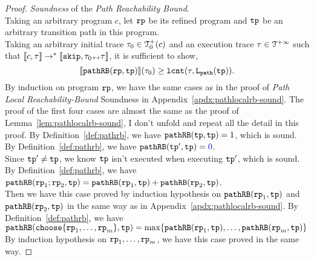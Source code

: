 \begin{proof}
\emph{Soundness} of the \emph{Path Reachability Bound}.
  \\
  Taking an arbitrary program $c$, let $\mathtt{rp}$ be its refined program and $\mathtt{tp}$ be an arbitrary transition path in this program.
  \\
Taking an arbitrary initial trace $\mathtt{\tau}_0 \in \mathcal{T}^{+}_0(c)$  and an execution trace $\mathtt{\tau} \in \mathcal{T}^{+\infty}$
 such that $\llbracket {c}, \mathtt{\tau} \rrbracket \to^{*} \llbracket \mathtt{skip}, \mathtt{\tau}_0 {\scriptscriptstyle ++} \mathtt{\tau} \rrbracket$,
 it is sufficient to show,
 \[
 \llbracket \mathtt{pathRB}(\mathtt{rp}, \mathtt{tp}) \rrbracket(\mathtt{\tau}_0) \geq \mathtt{lcnt}(\mathtt{\tau}, \mathtt{L}_{\mathtt{path}}(\mathtt{tp})) .
 \]
By induction on program $\mathtt{rp}$, we have the same cases as in the proof of \emph{Path Local Reachability-Bound} Soundness in Appendix~\ref{apdx:pathlocalrb-sound}.
The proof of the first four cases are almost the same as the proof of Lemma~\ref{lem:pathlocalrb-sound}, I don't unfold and repeat all the detail in this proof.
\caseL{$\rprog = \tpath$}
By Definition~\ref{def:pathrb}, we have $\mathtt{pathRB}(\mathtt{tp}, \mathtt{tp}) = 1$, which is sound.
By Definition~\ref{def:pathrb}, we have $\inoutB(\tpath', \tpath) = \highlight{0}$.
\\
Since $\mathtt{tp}' \neq \mathtt{tp}$, we know $\mathtt{tp}$ isn't executed when executing $\mathtt{tp}'$, which is sound.
By Definition~\ref{def:pathrb}, we have $\mathtt{pathRB}(\mathtt{rp}_1;\mathtt{rp}_2, \mathtt{tp}) = \mathtt{pathRB}(\mathtt{rp}_1, \mathtt{tp}) + \mathtt{pathRB}(\mathtt{rp}_2, \mathtt{tp}) $.
\\
Then we have this case proved by induction hypothesis on $\mathtt{pathRB}(\mathtt{rp}_1, \mathtt{tp})$ and $\mathtt{pathRB}(\mathtt{rp}_2, \mathtt{tp})$ in the same way as in Appendix~\ref{apdx:pathlocalrb-sound}.
By Definition~\ref{def:pathrb}, we have $\inoutB(\rpchoose{\rprog_1, \ldots, \rprog_m }, \tpath) = 
\max\left\{ \inoutB(\rprog_1, \tpath), \ldots, \inoutB(\rprog_m, \tpath) \right\}$ 
By induction hypothesis on $\mathtt{rp}_1, \ldots, \mathtt{rp}_m$, we have this case proved in the same way.


\end{proof}

